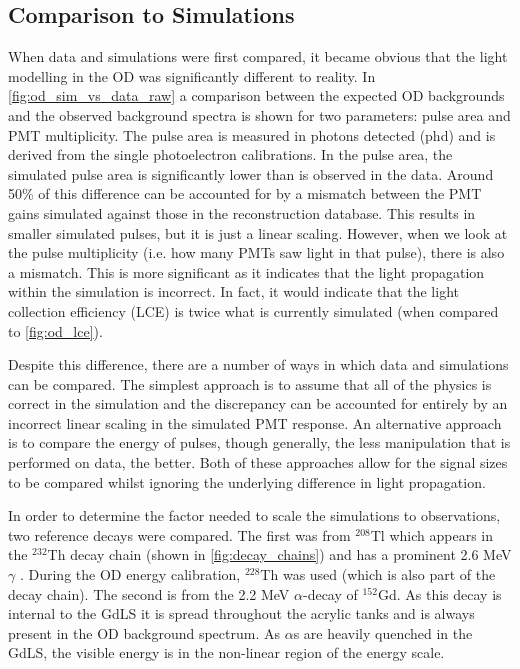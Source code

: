 

\subsection{Comparison to Simulations}
\par

When data and simulations were first compared, it became obvious that the light modelling in the OD was significantly different to reality.
In \autoref{fig:od_sim_vs_data_raw} a comparison between the expected OD backgrounds and the observed background spectra is shown for two parameters: pulse area and PMT multiplicity.
The pulse area is measured in photons detected (phd) and is derived from the single photoelectron calibrations.
In the pulse area, the simulated pulse area is significantly lower than is observed in the data.
Around 50\% of this difference can be accounted for by a mismatch between the PMT gains simulated against those in the reconstruction database.
This results in smaller simulated pulses, but it is just a linear scaling.
However, when we look at the pulse multiplicity (i.e. how many PMTs saw light in that pulse), there is also a mismatch.
This is more significant as it indicates that the light propagation within the simulation is incorrect.
In fact, it would indicate that the light collection efficiency (LCE) is twice what is currently simulated (when compared to \autoref{fig:od_lce}).



\par
Despite this difference, there are a number of ways in which data and simulations can be compared.
The simplest approach is to assume that all of the physics is correct in the simulation and the discrepancy can be accounted for entirely by an incorrect linear scaling in the simulated PMT response.
An alternative approach is to compare the energy of pulses, though generally, the less manipulation that is performed on data, the better.
Both of these approaches allow for the signal sizes to be compared whilst ignoring the underlying difference in light propagation.

\par
In order to determine the factor needed to scale the simulations to observations, two reference decays were compared.
The first was from ${}^{208}$Tl which appears in the ${}^{232}$Th decay chain (shown in \autoref{fig:decay_chains}) and has a prominent 2.6 MeV $\gamma$ \cite{radon_chains_ref}.
During the OD energy calibration, ${}^{228}$Th was used (which is also part of the decay chain).
The second is from the 2.2 MeV $\alpha$-decay of ${}^{152}$Gd.
As this decay is internal to the GdLS it is spread throughout the acrylic tanks and is always present in the OD background spectrum.
As $\alpha$s are heavily quenched in the GdLS, the visible energy is in the non-linear region of the energy scale.

